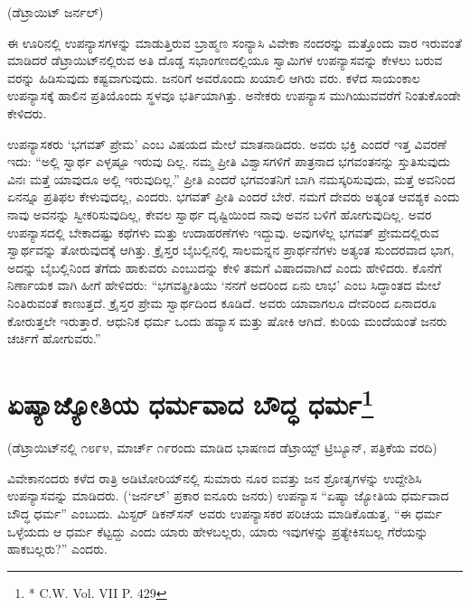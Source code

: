 \delimiter

\begin{center}
(ಡೆಟ್ರಾಯಿಟ್​ ಜರ್ನಲ್​)
\end{center}

ಈ ಊರಿನಲ್ಲಿ ಉಪನ್ಯಾಸಗಳನ್ನು ಮಾಡುತ್ತಿರುವ ಬ್ರಾಹ್ಮಣ ಸಂನ್ಯಾಸಿ ವಿವೇಕಾ ನಂದರನ್ನು ಮತ್ತೊಂದು ವಾರ ಇರುವಂತೆ ಮಾಡಿದರೆ ಡೆಟ್ರಾಯಿಟ್​ನಲ್ಲಿರುವ ಅತಿ ದೊಡ್ಡ ಸಭಾಂಗಣದಲ್ಲಿಯೂ ಸ್ವಾಮಿಗಳ ಉಪನ್ಯಾಸವನ್ನು ಕೇಳಲು ಬರುವ ವರನ್ನು ಹಿಡಿಸುವುದು ಕಷ್ಟವಾಗುವುದು. ಜನರಿಗೆ ಅವರೊಂದು ಖಯಾಲಿ ಆಗಿರು ವರು. ಕಳೆದ ಸಾಯಂಕಾಲ ಉಪನ್ಯಾಸಕ್ಕೆ ಹಾಲಿನ ಪ್ರತಿಯೊಂದು ಸ್ಥಳವೂ ಭರ್ತಿಯಾಗಿತ್ತು. ಅನೇಕರು ಉಪನ್ಯಾಸ ಮುಗಿಯುವವರೆಗೆ ನಿಂತುಕೊಂಡೇ ಕೇಳಿದರು.

ಉಪನ್ಯಾಸಕರು ‘ಭಗವತ್​ ಪ್ರೇಮ’ ಎಂಬ ವಿಷಯದ ಮೇಲೆ ಮಾತನಾಡಿದರು. ಅವರು ಭಕ್ತಿ ಎಂದರೆ ಇತ್ತ ವಿವರಣೆ ಇದು: “ಅಲ್ಲಿ ಸ್ವಾರ್ಥ ಎಳ್ಳಷ್ಟೂ ಇರುವು ದಿಲ್ಲ. ನಮ್ಮ ಪ್ರೀತಿ ವಿಶ್ವಾಸಗಳಿಗೆ ಪಾತ್ರನಾದ ಭಗವಂತನನ್ನು ಸ್ತುತಿಸುವುದು ವಿನಃ ಮತ್ತೆ ಯಾವುದೂ ಅಲ್ಲಿ ಇರುವುದಿಲ್ಲ.” ಪ್ರೀತಿ ಎಂದರೆ ಭಗವಂತನಿಗೆ ಬಾಗಿ ನಮಸ್ಕರಿಸುವುದು, ಮತ್ತೆ ಅವನಿಂದ ಏನನ್ನೂ ಪ್ರತಿಫಲ ಕೇಳುವುದಲ್ಲ, ಎಂದರು. ಭಗವತ್​ ಪ್ರೀತಿ ಎಂದರೆ ಬೇರೆ. ನಮಗೆ ದೇವರು ಅತ್ಯಂತ ಆವಶ್ಯಕ ಎಂದು ನಾವು ಅವನನ್ನು ಸ್ವೀಕರಿಸುವುದಿಲ್ಲ, ಕೇವಲ ಸ್ವಾರ್ಥ ದೃಷ್ಟಿಯಿಂದ ನಾವು ಅವನ ಬಳಿಗೆ ಹೋಗುವುದಿಲ್ಲ. ಅವರ ಉಪನ್ಯಾಸದಲ್ಲಿ ಬೇಕಾದಷ್ಟು ಕಥೆಗಳು ಮತ್ತು ಉದಾಹರಣೆಗಳು ಇದ್ದುವು. ಅವುಗಳೆಲ್ಲ ಭಗವತ್​ ಪ್ರೇಮದಲ್ಲಿರುವ ಸ್ವಾರ್ಥವನ್ನು ತೋರುವುದಕ್ಕೆ ಆಗಿತ್ತು. ಕ್ರೈಸ್ತರ ಬೈಬಲ್ಲಿನಲ್ಲಿ ಸಾಲಮನ್ನನ ಪ್ರಾರ್ಥನೆಗಳು ಅತ್ಯಂತ ಸುಂದರವಾದ ಭಾಗ, ಅದನ್ನು ಬೈಬಲ್ಲಿನಿಂದ ತೆಗೆದು ಹಾಕುವರು ಎಂಬುದನ್ನು ಕೇಳಿ ತಮಗೆ ವಿಷಾದವಾಗಿದೆ ಎಂದು ಹೇಳಿದರು. ಕೊನೆಗೆ ನಿರ್ಣಾಯಕ ವಾಗಿ ಹೀಗೆ ಹೇಳಿದರು: “ಭಗವತ್ಪ್ರೀತಿಯು ‘ನನಗೆ ಅದರಿಂದ ಏನು ಲಾಭ’ ಎಂಬ ಸಿದ್ಧಾಂತದ ಮೇಲೆ ನಿಂತಿರುವಂತೆ ಕಾಣುತ್ತದೆ. ಕ್ರೈಸ್ತರ ಪ್ರೇಮ ಸ್ವಾರ್ಥದಿಂದ ಕೂಡಿದೆ. ಅವರು ಯಾವಾಗಲೂ ದೇವರಿಂದ ಏನಾದರೂ ಕೋರುತ್ತಲೇ ಇರುತ್ತಾರೆ. ಆಧುನಿಕ ಧರ್ಮ ಒಂದು ಹವ್ಯಾಸ ಮತ್ತು ಷೋಕಿ ಆಗಿದೆ. ಕುರಿಯ ಮಂದೆಯಂತೆ ಜನರು ಚರ್ಚಿಗೆ ಹೋಗುವರು.”


\section[ಏಷ್ಯಾಜ್ಯೋತಿಯ ಧರ್ಮವಾದ ಬೌದ್ಧ ಧರ್ಮ]{ಏಷ್ಯಾಜ್ಯೋತಿಯ ಧರ್ಮವಾದ ಬೌದ್ಧ ಧರ್ಮ\protect\footnote{* C.W. Vol. VII P. 429}}

\begin{center}
(ಡೆಟ್ರಾಯಿಟ್​ನಲ್ಲಿ ೧೮೯೪, ಮಾರ್ಚ್​ ೧೯ರಂದು ಮಾಡಿದ ಭಾಷಣದ ಡೆಟ್ರಾಯ್ಟ್​ ಟ್ರಿಬ್ಯೂನ್​, ಪತ್ರಿಕೆಯ ವರದಿ)
\end{center}

ವಿವೇಕಾನಂದರು ಕಳೆದ ರಾತ್ರಿ ಅಡಿಟೋರಿಯ್​ನಲ್ಲಿ ಸುಮಾರು ನೂರ ಐವತ್ತು ಜನ ಶ್ರೋತೃಗಳನ್ನು ಉದ್ದೇಶಿಸಿ ಉಪನ್ಯಾಸವನ್ನು ಮಾಡಿದರು. (‘ಜರ್ನಲ್​’ ಪ್ರಕಾರ ಐನೂರು ಜನರು) ಉಪನ್ಯಾಸ “ಏಷ್ಯಾ ಜ್ಯೋತಿಯ ಧರ್ಮವಾದ ಬೌದ್ಧ ಧರ್ಮ” ಎಂಬುದು. ಮಿಸ್ಟರ್​ ಡಿಕನ್​ಸನ್​ ಅವರು ಉಪನ್ಯಾಸಕರ ಪರಿಚಯ ಮಾಡಿಕೊಡುತ್ತ, “ಈ ಧರ್ಮ ಒಳ್ಳೆಯದು ಆ ಧರ್ಮ ಕೆಟ್ಟದ್ದು ಎಂದು ಯಾರು ಹೇಳಬಲ್ಲರು, ಯಾರು ಇವುಗಳನ್ನು ಪ್ರತ್ಯೇಕಿಸಬಲ್ಲ ಗೆರೆಯನ್ನು ಹಾಕಬಲ್ಲರು?” ಎಂದರು.

